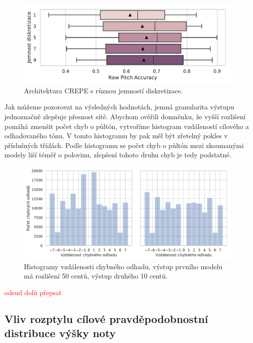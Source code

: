 \begin{figure}[h]\centering
    \includegraphics[scale=0.6]{../img/figures/crepe_diskretizace.pdf}
\caption{Architektura CREPE s různou jemností diskretizace.}\label{obr:crepe_diskretizace}
\end{figure}

Jak můžeme pozorovat na výsledných hodnotách, jemná granularita výstupu jednoznačně zlepšuje přesnost sítě. Abychom ověřili domněnku, že vyšší rozlišení pomáhá zmenšit počet chyb o půltón, vytvoříme histogram vzdáleností cílového a odhadovaného tónu. V tomto histogramu by pak měl být zřetelný pokles v příslušných třídách. Podle histogramu se počet chyb o půltón mezi zkoumanými modely liší téměř o polovinu, zlepšení tohoto druhu chyb je tedy podstatné.

\begin{figure}[h]\centering
    \includegraphics[scale=0.6]{../img/figures/crepe_diskretizace_hist.pdf}
\caption{Histogramy vzdálenosti chybného odhadu, výstup prvního modelu má rozlišení 50 centů, výstup druhého 10 centů.}\label{obr:crepe_diskretizace}
\end{figure}

\textcolor{red}{odsud dolů přepsat}

\subsection{Vliv rozptylu cílové pravděpodobnostní distribuce výšky noty}

